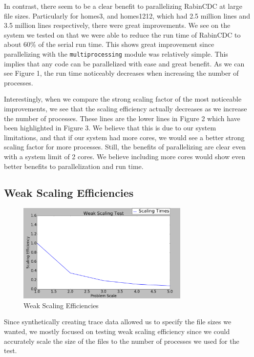 \documentclass{acmtog} %
\begin{document}
	In contrast, there seem to be a clear benefit to parallelizing RabinCDC at large file sizes. Particularly for homes3, and homes1212, which had 2.5 million lines and 3.5 million lines respectively, there were great improvements. We see on the system we tested on that we were able to reduce the run time of RabinCDC to about 60\% of the serial run time. This shows great improvement since parallelizing with the \texttt{multiprocessing} module was relatively simple. This implies that any code can be parallelized with ease and great benefit. As we can see Figure 1, the run time noticeably decreases when increasing the number of processes. 
	
	Interestingly, when we compare the strong scaling factor of the most noticeable improvements, we see that the scaling efficiency actually decreases as we increase the number of processes. These lines are the lower lines in Figure 2 which have been highlighted in Figure 3. We believe that this is due to our system limitations, and that if our system had more cores, we would see a better strong scaling factor for more processes. Still, the benefits of parallelizing are clear even with a system limit of 2 cores. We believe including more cores would show even better benefits to parallelization and run time. 
	
	\subsection{Weak Scaling Efficiencies}
		\begin{figure}
			\centerline{\includegraphics[width=8.5cm]{img/WeakScalingOnly}}
			\caption{Weak Scaling Efficiencies}
			\label{fig:weakscaleonly}
		\end{figure}

	Since synthetically creating trace data allowed us to specify the file sizes we wanted, we mostly focused on testing weak scaling efficiency since we could accurately scale the size of the files to the number of processes we used for the test. 
	
\end{document}
